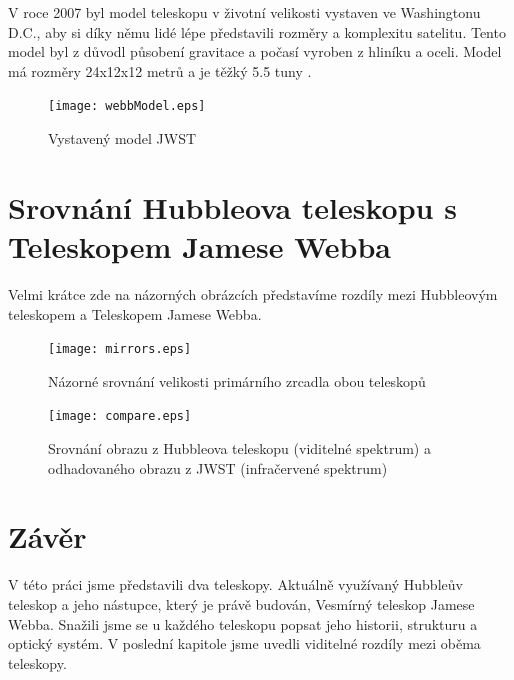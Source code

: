 \documentclass[a4paper,11pt]{article}
\begin{document}
V roce 2007 byl model teleskopu v životní velikosti vystaven ve Washingtonu D.C., aby si díky němu lidé lépe představili rozměry a komplexitu satelitu. Tento model byl z důvodl působení gravitace a počasí vyroben z hliníku a oceli. Model má rozměry 24x12x12 metrů a je těžký 5.5 tuny \cite{wikipediaWebbEn}.

\begin{figure}[h]
\begin{center}
\texttt{[image: webbModel.eps]}
\caption{Vystavený model JWST}
\end{center}
\end{figure}

\section{Srovnání Hubbleova teleskopu s Teleskopem Jamese Webba}
Velmi krátce zde na názorných obrázcích představíme rozdíly mezi Hubbleovým teleskopem a Teleskopem Jamese Webba.

\begin{figure}[h]
\begin{center}
\texttt{[image: mirrors.eps]}
\caption{Názorné srovnání velikosti primárního zrcadla obou teleskopů}
\end{center}
\end{figure}

\begin{figure}[h]
\begin{center}
\texttt{[image: compare.eps]}
\caption{Srovnání obrazu z Hubbleova teleskopu (viditelné spektrum) a odhadovaného obrazu z JWST (infračervené spektrum)}
\end{center}
\end{figure}

\section{Závěr}
V této práci jsme představili dva teleskopy. Aktuálně využívaný Hubbleův teleskop a jeho nástupce, který je právě budován, Vesmírný teleskop Jamese Webba. Snažili jsme se u každého teleskopu popsat jeho historii, strukturu a optický systém. V poslední kapitole jsme uvedli viditelné rozdíly mezi oběma teleskopy.
\newpage


\def\refname{Použitá literatura}

\end{document}
